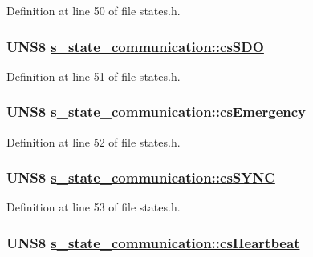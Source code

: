 Definition at line 50 of file states.h.\hypertarget{structs__state__communication_c6f5d674a8f305fc8eacdcd258c17ba8}{
\subsubsection[csSDO]{\setlength{\rightskip}{0pt plus 5cm}UNS8 \hyperlink{structs__state__communication_c6f5d674a8f305fc8eacdcd258c17ba8}{s\_\-state\_\-communication::cs\-SDO}}}
\label{structs__state__communication_c6f5d674a8f305fc8eacdcd258c17ba8}




Definition at line 51 of file states.h.\hypertarget{structs__state__communication_42d1093b9e6625029428944fdc7c7f5a}{
\subsubsection[csEmergency]{\setlength{\rightskip}{0pt plus 5cm}UNS8 \hyperlink{structs__state__communication_42d1093b9e6625029428944fdc7c7f5a}{s\_\-state\_\-communication::cs\-Emergency}}}
\label{structs__state__communication_42d1093b9e6625029428944fdc7c7f5a}




Definition at line 52 of file states.h.\hypertarget{structs__state__communication_9a4709f6f39e18b303c91edbfd1d6220}{
\subsubsection[csSYNC]{\setlength{\rightskip}{0pt plus 5cm}UNS8 \hyperlink{structs__state__communication_9a4709f6f39e18b303c91edbfd1d6220}{s\_\-state\_\-communication::cs\-SYNC}}}
\label{structs__state__communication_9a4709f6f39e18b303c91edbfd1d6220}




Definition at line 53 of file states.h.\hypertarget{structs__state__communication_1d467631df619c6c321c3fc040a3eb22}{
\subsubsection[csHeartbeat]{\setlength{\rightskip}{0pt plus 5cm}UNS8 \hyperlink{structs__state__communication_1d467631df619c6c321c3fc040a3eb22}{s\_\-state\_\-communication::cs\-Heartbeat}}}
\label{structs__state__communication_1d467631df619c6c321c3fc040a3eb22}




